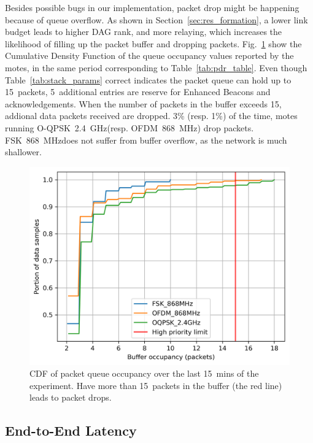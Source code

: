 \documentclass[sensors,article,submit,moreauthors,pdftex]{Definitions/mdpi}
\newcommand{\fsk}           {FSK~868~MHz}
\newcommand{\oqpsk}         {O-QPSK~2.4~GHz}
\newcommand{\ofdm}          {OFDM~868~MHz}
\newcommand{\figwidth}      {0.85}
\begin{document}

Besides possible bugs in our implementation, packet drop might be happening because of queue overflow.
As shown in Section~\ref{sec:res_formation}, a lower link budget leads to higher DAG rank, and more relaying, which increases the likelihood of filling up the packet buffer and dropping packets.
Fig.~\ref{fig:maxBufferSize_cdf_plot_full_steady_15} show the Cumulative Density Function of the queue occupancy values reported by the motes, in the same period corresponding to Table~\ref{tab:pdr_table}.
Even though Table~\ref{tab:stack_params} correct indicates the packet queue can hold up to 15~packets, 5~additional entries are reserve for Enhanced Beacons and acknowledgements.
When the number of packets in the buffer exceeds 15, addional data packets received are dropped.
3\% (resp. 1\%) of the time, motes running \oqpsk (resp. \ofdm) drop packets.
\fsk does not suffer from buffer overflow, as the network is much shallower.

\begin{figure}
	\centering
	\includegraphics[width=\figwidth\columnwidth]{maxBufferSize_cdf_plot_full_steady_15}
	\caption{CDF of packet queue occupancy over the last 15~mins of the experiment. Have more than 15~packets in the buffer (the red line) leads to packet drops.}
    \label{fig:maxBufferSize_cdf_plot_full_steady_15}
\end{figure}

\subsection{End-to-End Latency}
\label{sec:res_latency}
\end{document}
